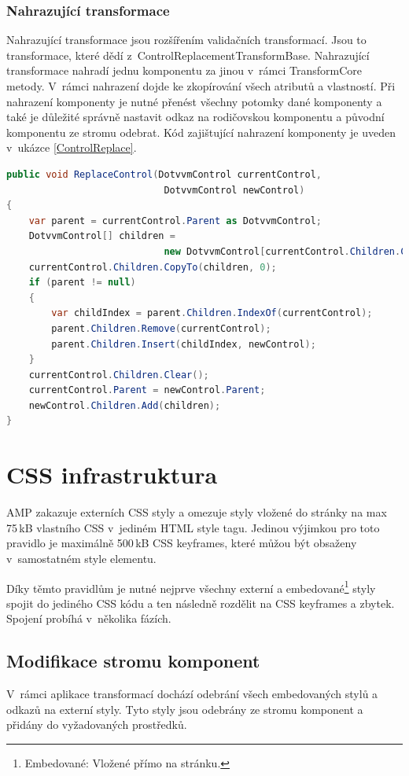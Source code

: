 \subsubsection{Nahrazující transformace}
    Nahrazující transformace jsou rozšířením validačních transformací. Jsou to transformace, které dědí z~ControlReplacementTransformBase. Nahrazující transformace nahradí jednu komponentu za jinou v~rámci TransformCore metody. V~rámci nahrazení dojde ke zkopírování všech atributů a vlastností. Při nahrazení komponenty je nutné přenést všechny potomky dané komponenty a také je důležité správně nastavit odkaz na rodičovskou komponentu a původní komponentu ze stromu odebrat. Kód zajištující nahrazení komponenty je uveden v~ukázce \ref{ControlReplace}.
    \pagebreak
    \begin{lstlisting}[language=c#, caption= Nahrazení jedné DotVVM komponenty za jinou. ,label=ControlReplace,captionpos=t]
public void ReplaceControl(DotvvmControl currentControl,
                            DotvvmControl newControl)
{
    var parent = currentControl.Parent as DotvvmControl;
    DotvvmControl[] children =
                            new DotvvmControl[currentControl.Children.Count];
    currentControl.Children.CopyTo(children, 0);
    if (parent != null)
    {
        var childIndex = parent.Children.IndexOf(currentControl);
        parent.Children.Remove(currentControl);
        parent.Children.Insert(childIndex, newControl);
    }
    currentControl.Children.Clear();
    currentControl.Parent = newControl.Parent;
    newControl.Children.Add(children);
}

\end{lstlisting}

\section{CSS infrastruktura}
AMP zakazuje externích CSS styly a omezuje styly vložené do stránky na max 75\,kB vlastního CSS v~jediném HTML style tagu. Jedinou výjimkou pro toto pravidlo je maximálně 500\,kB CSS keyframes, které můžou být obsaženy v~samostatném style elementu.

Díky těmto pravidlům je nutné nejprve všechny externí a embedované\footnote{Embedované: Vložené přímo na stránku.} styly spojit do jediného CSS kódu a ten následně rozdělit na CSS keyframes a zbytek. Spojení probíhá v~několika fázích.
\subsection*{Modifikace stromu komponent}
V~rámci aplikace transformací dochází odebrání všech embedovaných stylů a odkazů na externí styly. Tyto styly jsou odebrány ze stromu komponent a přidány do vyžadovaných prostředků.

